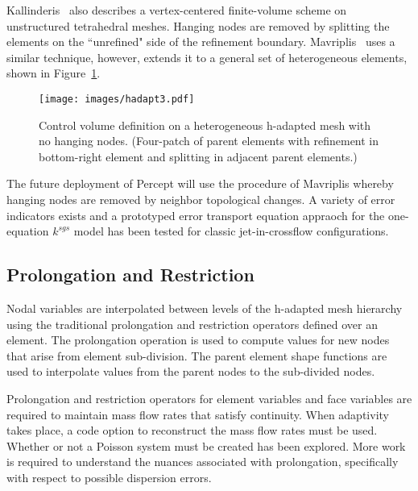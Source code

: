 Kallinderis~\cite{kallinderis:93} also describes a vertex-centered
finite-volume scheme on unstructured tetrahedral meshes.  Hanging
nodes are removed by splitting the elements on the ``unrefined"
side of the refinement boundary. Mavriplis~\cite{Mavriplis:00} uses a similar 
technique, however, extends it to a general set of heterogeneous elements,
shown in Figure~\ref{kallin-convol}.

\begin{figure}[h]
  \centerline{\texttt{[image: images/hadapt3.pdf]}}
  \vspace{0.25in}
  \caption{Control volume definition on a heterogeneous
           h-adapted mesh with no hanging nodes.
           (Four-patch of parent elements 
           with refinement in bottom-right element
           and splitting in adjacent parent elements.) }
  \label{kallin-convol}
\end{figure}

The future deployment of Percept will use the procedure of Mavriplis whereby hanging 
nodes are removed by neighbor topological changes. A variety of error indicators exists 
and a prototyped error transport equation appraoch for the one-equation $k^{sgs}$ model 
has been tested for classic jet-in-crossflow configurations.

\subsection{Prolongation and Restriction}

Nodal variables are interpolated between levels of the
h-adapted mesh hierarchy using the traditional prolongation
and restriction operators defined over an element.  The
prolongation operation is used to compute values for new
nodes that arise from element sub-division.  The parent element
shape functions are used to interpolate values from the parent
nodes to the sub-divided nodes.

Prolongation and restriction operators for element variables and 
face variables are required to maintain mass flow rates that
satisfy continuity. When adaptivity takes place, a code option
to reconstruct the mass flow rates must be used. Whether or not
a Poisson system must be created has been explored. More work is 
required to understand the nuances associated with prolongation, 
specifically with respect to possible dispersion errors.
